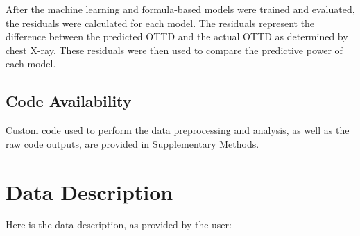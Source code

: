 \documentclass[11pt]{article}
\begin{document}
After the machine learning and formula-based models were trained and evaluated, the residuals were calculated for each model. The residuals represent the difference between the predicted OTTD and the actual OTTD as determined by chest X-ray. These residuals were then used to compare the predictive power of each model.\subsection*{Code Availability}

Custom code used to perform the data preprocessing and analysis, as well as the raw code outputs, are provided in Supplementary Methods.


\clearpage
\appendix

\section{Data Description} \label{sec:data_description} Here is the data description, as provided by the user:
\end{document}
